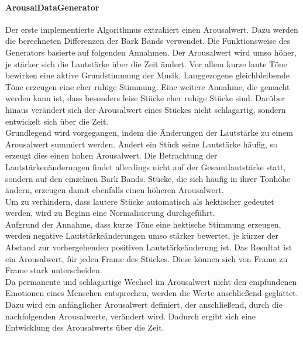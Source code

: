 \documentclass[11pt,a4paper]{article}
\begin{document}
\paragraph{ArousalDataGenerator}
Der erste implementierte Algorithmus extrahiert einen Arousalwert. Dazu werden die berechneten Differenzen der Bark Bands verwendet. Die Funktionsweise des Generators basierte auf folgenden Annahmen. Der Arousalwert wird umso höher, je stärker sich die Lautstärke über die Zeit ändert. Vor allem kurze laute Töne bewirken eine aktive Grundstimmung der Musik. Langgezogene gleichbleibende Töne erzeugen eine eher ruhige Stimmung. Eine weitere Annahme, die gemacht werden kann ist, dass besonders leise Stücke eher ruhige Stücke sind. Darüber hinaus verändert sich der Arousalwert eines Stückes nicht schlagartig, sondern entwickelt sich über die Zeit.\\
Grundlegend wird vorgegangen, indem die Änderungen der Lautstärke zu einem Arousalwert summiert werden. Ändert ein Stück seine Lautstärke häufig, so erzeugt dies einen hohen Arousalwert. Die Betrachtung der Lautstärkenänderungen findet allerdings nicht auf der Gesamtlautstärke statt, sondern auf den einzelnen Bark Bands. Stücke, die sich häufig in ihrer Tonhöhe ändern, erzeugen damit ebenfalls einen höheren Arousalwert.\\
Um zu verhindern, dass lautere Stücke automatisch als hektischer gedeutet werden, wird zu Beginn eine Normalisierung durchgeführt.\\
Aufgrund der Annahme, dass kurze Töne eine hektische Stimmung erzeugen, werden negative Lautstärkeänderungen umso stärker bewertet, je kürzer der Abstand zur vorhergehenden positiven Lautstärkeänderung ist. Das Resultat ist ein Arousalwert, für jeden Frame des Stückes. Diese können sich von Frame zu Frame stark unterscheiden.\\
Da permanente und schlagartige Wechsel im Arousalwert nicht den empfundenen Emotionen eines Menschen entsprechen, werden die Werte anschließend geglättet. Dazu wird ein anfänglicher Arousalwert definiert, der anschließend, durch die nachfolgenden Arousalwerte, verändert wird. Dadurch ergibt sich eine Entwicklung des Arousalwerts über die Zeit.
\end{document}
